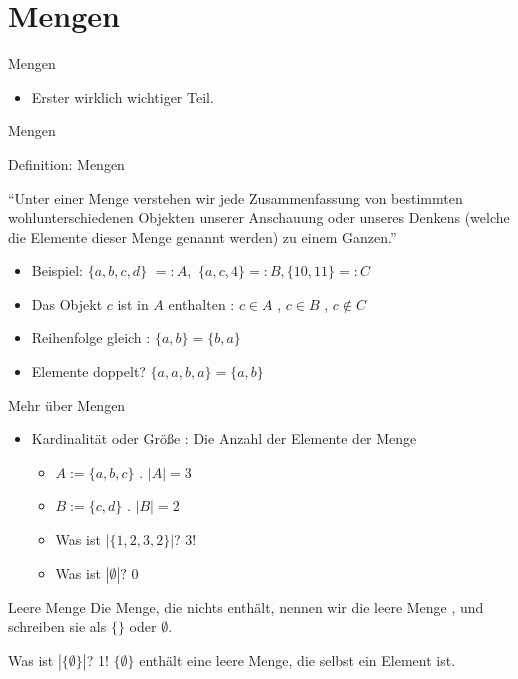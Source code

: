 \documentclass{beamer}
\begin{document}
\section{Mengen}


\begin{frame}{Mengen}
	\begin{itemize}
		 \item Erster wirklich wichtiger Teil.
	\end{itemize}
\end{frame}

\begin{frame}{Mengen}
	\begin{block}{Definition: Mengen}
		 
		``Unter einer Menge verstehen wir jede
		Zusammenfassung von bestimmten
		wohlunterschiedenen Objekten unserer
		Anschauung oder unseres Denkens (welche die
		Elemente dieser Menge genannt werden) zu einem
		Ganzen.''
	\end{block}
	
	\begin{itemize}
		\item Beispiel: $\{a, b, c, d\}$ $ =: A,$ $\{a, c, 4\} =: B, \{10, 11\} =: C$
		\item Das Objekt $c$ ist in $A$ enthalten  : $c \in A$  , $c \in B$  , $c \notin C$
		\item Reihenfolge gleich  : $\{a, b\} = \{b, a\}$
		\item Elemente doppelt?   $\{a, a, b, a\} = \{a, b\}$
	\end{itemize}
\end{frame}

\begin{frame}{Mehr über Mengen}
	\begin{itemize}
		\item Kardinalität   oder Größe  : Die Anzahl der Elemente der Menge
		\begin{itemize}
			\item $A := \{a, b, c\}$  . $|A| = 3$
			\item $B := \{c, d\}$  . $|B| = 2$
			\item Was ist $|\{1, 2, 3, 2\}|$?   $3$!
			\item Was ist $|\emptyset|?$   $0$
		\end{itemize}
	\end{itemize}
	
	 
	
	\begin{block}{Leere Menge}
		Die Menge, die nichts enthält, nennen wir die leere Menge  , und schreiben sie als $\{\}$ oder $\emptyset$.
	\end{block}
	
	 
	
	Was ist $|\{\emptyset\}|$?   1!   $\{\emptyset\}$ enthält eine leere Menge, die selbst ein Element ist.
\end{frame}
\end{document}
